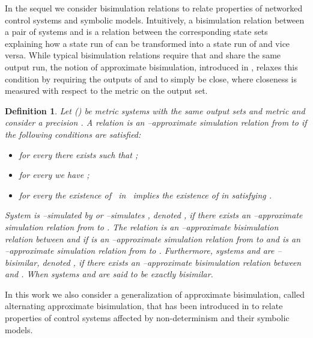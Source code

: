 \documentclass{amsart}
\newtheorem{definition}[theorem]{Definition}
\begin{document}
In the sequel we consider bisimulation relations \cite{Milner,Park} to relate properties of networked control systems and symbolic models. Intuitively, a bisimulation relation between a pair of systems  and  is a relation between the corresponding state sets explaining how a state run  of  can be transformed into a state run  of  and vice versa. While typical bisimulation relations require that  and  share the same output run, the notion of approximate bisimulation, introduced in \cite{AB-TAC07}, relaxes this condition by requiring the outputs of  and  to simply be close, where closeness is measured with respect to the metric on the output set. 

\begin{definition}
\cite{AB-TAC07}
\label{ASR} 
Let \mbox{} () be metric systems with the same output sets  and metric  and consider a precision . A relation  is an --approximate simulation relation from  to  if the following conditions are satisfied:

\begin{itemize}
\item[(i)] for every  there exists  such that 
;
\item[(ii)] for every  we have \mbox{};
\item[(iii)] for every  the existence of \mbox{ in } implies the existence of \mbox{} in  satisfying .
\end{itemize}

System  is --simulated by  or  --simulates , denoted \mbox{}, if there exists an --approximate simulation relation from  to . The relation  is an \mbox{--approximate} bisimulation relation between  and  if  is an \mbox{--approximate} simulation relation from  to  and  is an \mbox{--approximate} simulation relation from  to . Furthermore, systems  and  are --bisimilar, denoted \mbox{}, if there exists an --approximate bisimulation relation  between  and . When  systems  and  are said to be exactly bisimilar.
\end{definition}

In this work we also consider a generalization of approximate bisimulation, called alternating approximate bisimulation, that has been introduced in \cite{PolaSIAM2009} to relate properties of control systems affected by non-determinism and their symbolic models. 
\end{document}
